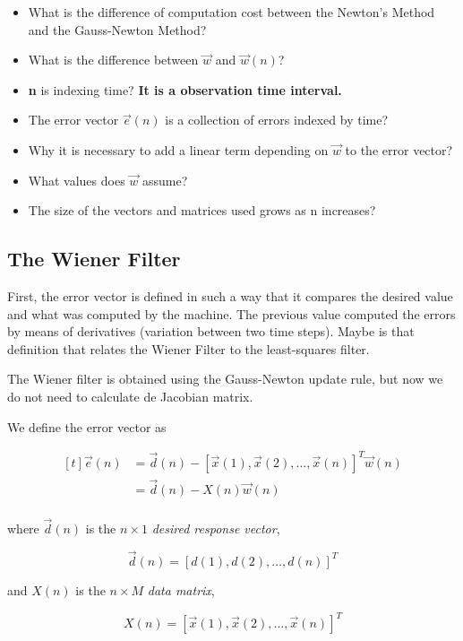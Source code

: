 \documentclass[twocolumn]{article}
\begin{document}
\begin{itemize}
	\item What is the difference of computation cost between the Newton's Method and the Gauss-Newton Method?
	\item What is the difference between $ \vec{w} $ and $ \vec{w} (n) $?
	\item \textbf{n} is indexing time? \textbf{It is a observation time interval.}
	\item The error vector $ \vec{e} (n) $ is a collection of errors indexed by time?
	\item Why it is necessary to add a linear term depending on $ \vec{w} $ to the error vector?
	\item What values does $ \vec{w} $ assume?
	\item The size of the vectors and matrices used grows as n increases?
\end{itemize}

\subsection{The Wiener Filter}

First, the error vector is defined in such a way that it compares the desired value and what was computed by the machine. The previous value computed the errors by means of derivatives (variation between two time steps). Maybe is that definition that relates the Wiener Filter to the least-squares filter.

The Wiener filter is obtained using the Gauss-Newton update rule, but now we do not need to calculate de Jacobian matrix.


We define the error vector as

$$ \begin{aligned}[t]
	\vec{e} (n) &= \vec{d} (n) - \left[ \vec{x} (1), \vec{x} (2), \ldots, \vec{x} (n) \right]^{T} \vec{w} (n) \\
		    &= \vec{d} (n) - X (n) \vec{w} (n)\\
\end{aligned} $$

\noindent where $ \vec{d} (n) $ is the $ n \times 1 $ \textit{desired response vector},

$$ \vec{d} (n) = \left[ d (1), d (2), \ldots, d (n) \right]^{T} $$

and $ X (n) $ is the $ n \times M $ \textit{data matrix},

$$ X (n) = \left[ \vec{x} (1), \vec{x} (2), \ldots, \vec{x} (n) \right]^{T} $$
\end{document}
